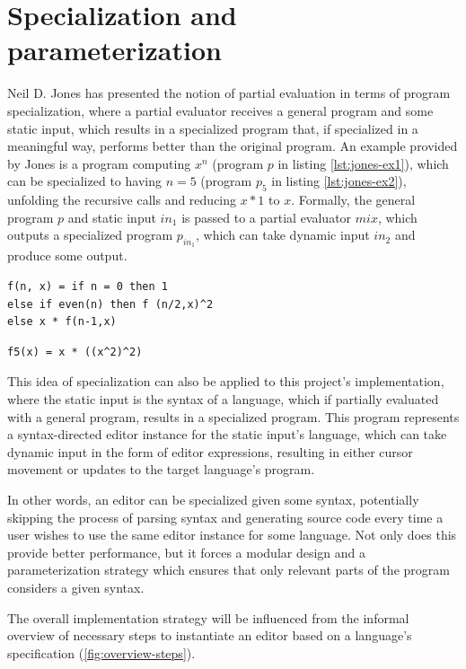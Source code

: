 \documentclass{article}
\begin{document}
\section{Specialization and parameterization}
Neil D. Jones has presented the notion of partial evaluation in terms of program specialization\cite{jones96}, where a partial evaluator receives a general program and some static input, which results in a specialized program that, if specialized in a meaningful way, performs better than the original program. An example provided by Jones is a program computing $x^n$ (program $p$ in listing \ref{lst:jones-ex1}), which can be specialized to having $n = 5$ (program $p_5$ in listing \ref{lst:jones-ex2}), unfolding the recursive calls and reducing $x*1$ to $x$. Formally, the general program $p$ and static input $in_1$ is passed to a partial evaluator $mix$, which outputs a specialized program $p_{in_1}$, which can take dynamic input $in_2$ and produce some output.

\begin{lstlisting}[style=inline,label={lst:jones-ex1},caption={Two-input program $p$}]
f(n, x) = if n = 0 then 1
else if even(n) then f (n/2,x)^2
else x * f(n-1,x)
\end{lstlisting}

\begin{lstlisting}[style=inline,label={lst:jones-ex2},caption={Specialization of program $p$}]
f5(x) = x * ((x^2)^2)
\end{lstlisting}

This idea of specialization can also be applied to this project's implementation, where the static input is the syntax of a language, which if partially evaluated with a general program, results in a specialized program. This program represents a syntax-directed editor instance for the static input's language, which can take dynamic input in the form of editor expressions, resulting in either cursor movement or updates to the target language's program.

In other words, an editor can be specialized given some syntax, potentially skipping the process of parsing syntax and generating source code every time a user wishes to use the same editor instance for some language. Not only does this provide better performance, but it forces a modular design and a parameterization strategy which ensures that only relevant parts of the program considers a given syntax.

The overall implementation strategy will be influenced from the informal overview of necessary steps to instantiate an editor based on a language's specification (\ref{fig:overview-steps}).
\end{document}
